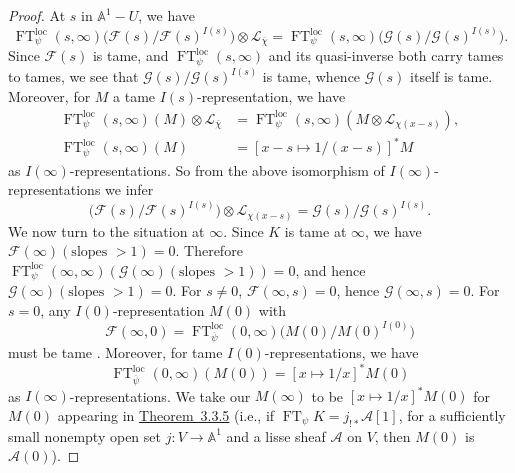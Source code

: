 \begin{proof}
At \(s\) in \(\mathbb{A}^1-U\), we have
\[
  \operatorname{FT}_{\psi}^{\mathrm{loc}}(s,\infty)
  \bigl(\mathcal{F}(s)/\mathcal{F}(s)^{I(s)}\bigr)
  \otimes\mathcal{L}_{\overline{\chi}}
  =
  \operatorname{FT}_{\psi}^{\mathrm{loc}}(s,\infty)
  \bigl(\mathcal{G}(s)/\mathcal{G}(s)^{I(s)}\bigr).
\]
Since \(\mathcal{F}(s)\) is tame, and
\(\operatorname{FT}_{\psi}^{\mathrm{loc}}(s,\infty)\) and its quasi-inverse
both carry tames to tames, we see that
\(\mathcal{G}(s)/\mathcal{G}(s)^{I(s)}\) is tame, whence \(\mathcal{G}(s)\)
itself is tame. Moreover, for \(M\) a tame \(I(s)\)-representation, we have
\cite[7.4.1.3]{Ka-ESDE}
\[
\begin{aligned}
  \operatorname{FT}_{\psi}^{\mathrm{loc}}(s,\infty)(M)
  \otimes\mathcal{L}_{\overline{\chi}}
  &=
  \operatorname{FT}_{\psi}^{\mathrm{loc}}(s,\infty)
  (M\otimes\mathcal{L}_{\chi(x-s)}),\\
  \operatorname{FT}_{\psi}^{\mathrm{loc}}(s,\infty)(M)
  &=
  [x-s\mapsto 1/(x-s)]^*M
\end{aligned}
\]
as \(I(\infty)\)-representations. So from the above isomorphism of
\(I(\infty)\)-representations we infer
\[
  \bigl(\mathcal{F}(s)/\mathcal{F}(s)^{I(s)}\bigr)
  \otimes\mathcal{L}_{\chi(x-s)}
  =
  \mathcal{G}(s)/\mathcal{G}(s)^{I(s)}.
\]
We now turn to the situation at \(\infty\). Since \(K\) is tame at \(\infty\),
we have \(\mathcal{F}(\infty)(\text{slopes }>1)=0\). Therefore
\(\operatorname{FT}_{\psi}^{\mathrm{loc}}(\infty,\infty)
(\mathcal{G}(\infty)(\text{slopes }>1))=0\), and hence
\(\mathcal{G}(\infty)(\text{slopes }>1)=0\). For \(s\ne0\),
\(\mathcal{F}(\infty,s)=0\), hence \(\mathcal{G}(\infty,s)=0\). For \(s=0\),
any \(I(0)\)-representation \(M(0)\) with
\[
  \mathcal{F}(\infty,0)
  =
  \operatorname{FT}_{\overline{\psi}}^{\mathrm{loc}}(0,\infty)
  \bigl(M(0)/M(0)^{I(0)}\bigr)
\]
must be tame \cite[7.4.4.4]{Ka-ESDE}. Moreover, for tame
\(I(0)\)-representations, we have \cite[7.4.4.3]{Ka-ESDE}
\[
  \operatorname{FT}_{\overline{\psi}}^{\mathrm{loc}}(0,\infty)(M(0))
  =
  [x\mapsto 1/x]^*M(0)
\]
as \(I(\infty)\)-representations. We take our \(M(\infty)\) to be
\([x\mapsto 1/x]^*M(0)\) for \(M(0)\) appearing in
\hyperref[thm:3.3.5]{Theorem~3.3.5} (i.e., if
\(\operatorname{FT}_{\psi}K=j_{!*}\mathcal{A}[1]\), for a sufficiently small
nonempty open set \(j:V\to\mathbb{A}^1\) and a lisse sheaf \(\mathcal{A}\) on
\(V\), then \(M(0)\) is \(\mathcal{A}(0)\)).


\end{proof}
